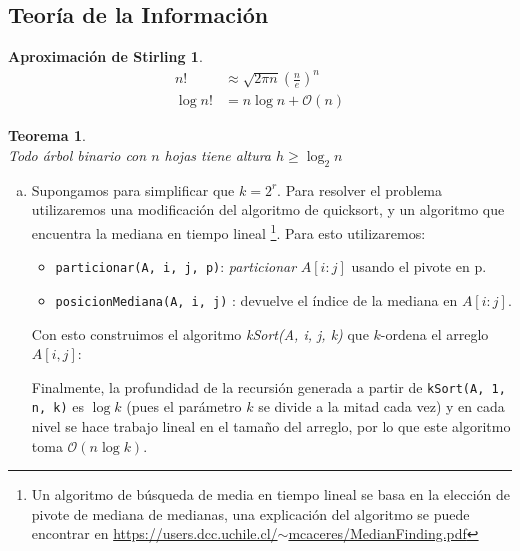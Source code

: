 \documentclass[dcc,uchile]{fcfmcourse}
\theoremstyle{plain}
\newtheorem{teo}{Teorema}
\theoremstyle{definition}
\newtheorem*{appr*}{Aproximación de Stirling}
\begin{document}
\begin{problems}
\section*{Teoría de la Información}
\problem 
\begin{appr*}\perfect\\
\begin{align*}
n!&\approx {\sqrt {2\pi n}}\left({\frac {n}{e}}\right)^{n}\\
\log{n!} &= n\log{n} + \mathcal{O}(n)
\end{align*}
\end{appr*}
\begin{teo}\jewel\\
Todo árbol binario con $n$ hojas tiene altura $h \ge \log_{2} n$
\end{teo}
\begin{enumerate}[a)]
\item Supongamos para simplificar que $k = 2^r$. Para resolver el problema utilizaremos una modificación del algoritmo de quicksort, y un algoritmo que encuentra la mediana en tiempo lineal \footnote{Un algoritmo de búsqueda de media en tiempo lineal se basa en la elección de pivote de mediana de medianas, una explicación del algoritmo se puede encontrar en \href{https://users.dcc.uchile.cl/~mcaceres/MedianFinding.pdf}{https://users.dcc.uchile.cl/$\sim$mcaceres/MedianFinding.pdf}}. Para esto utilizaremos:
\begin{itemize}
    \item \texttt{particionar(A, i, j, p)}: \textit{particionar} $A[i:j]$ usando el pivote en p.
    \item \texttt{posicionMediana(A, i, j)} : devuelve el índice de la mediana en $A[i:j]$.
\end{itemize}
Con esto construimos el algoritmo \textit{kSort(A, i, j, k)} que $k$-ordena el arreglo $A[i,j]$:\\
\begin{algorithm}[H]
\SetAlgoLined
{}
\end{algorithm}
Finalmente, la profundidad de la recursión generada a partir de \texttt{kSort(A, 1, n, k)} es $\log{k}$ (pues el parámetro $k$ se divide a la mitad cada vez) y en cada nivel se hace trabajo lineal en el tamaño del arreglo, por lo que este algoritmo toma $\mathcal{O}(n\log{k})$.

\end{enumerate}
\end{problems}
\end{document}
